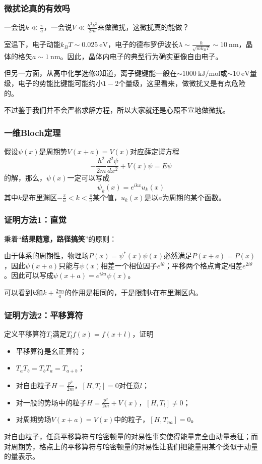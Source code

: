 \documentclass[CJK]{beamer}
\newcommand{\unit}[1]{\mathrm{\ #1}}
\begin{document}
\begin{frame}
\frametitle{\bch 微扰论真的有效吗 \ech}
\bch
一会说$k \ll \frac{\pi}{a}$，一会说$V \ll \frac{\hbar^2 k^2}{2m}$来做微扰，这微扰真的能做？
\par
室温下，电子动能$k_B T \sim 0.025 \unit{eV}$，电子的德布罗伊波长$\lambda \sim \frac{\hbar} { \sqrt{m k_B T}} \sim 10 \unit{nm}$，晶体的格矢$a\sim 1\unit{nm}$。因此，晶体内电子的典型行为确实更像自由电子。
\par
但另一方面，从高中化学选修3知道，离子键键能一般在$\sim 1000 \unit{kJ/mol}$或$\sim 10 \unit{eV}$量级，电子的势能比键能可能约小$1-2$个量级，这里看来，做微扰又是有点危险的。
\par
不过鉴于我们并不会严格求解方程，所以大家就还是心照不宣地做微扰。
\ech
\end{frame}

\begin{frame}
\frametitle{\bch 一维Bloch定理 \ech}
\bch
假设$\psi (x) $是周期势$V(x+a) = V(x)$对应薛定谔方程
$$
-\frac{\hbar^2}{2m} \frac{d^2 \psi}{dx^2} + V(x) \psi = E \psi
$$
的解，那么，$\psi (x)$一定可以写成
$$
\psi_k(x) = e^{ikx} u_k(x)
$$
其中$k$是布里渊区$-\frac{\pi}{a} < k < \frac{\pi}{a}$某个值，$u_k(x)$是以$a$为周期的某个函数。
\ech
\end{frame}


\begin{frame}
\frametitle{\bch 证明方法1：直觉 \ech}
\bch
秉着“{\bf 结果随意，路径搞笑}”的原则：\par
由于体系的周期性，物理场$P(x) = \psi^*(x) \psi(x)$必然满足$P(x+a) = P(x)$，因此$\psi(x+a)$只能与$\psi(x)$相差一个相位因子$e^{i\theta}$；平移两个格点肯定相差$e^{2i\theta}$。因此可以写成$\psi(x+a) = e^{ika} \psi(x)$。
\par
可以看到$k$和$k + \frac{2\pi n}{a}$的作用是相同的，于是限制$k$在布里渊区内。
\ech
\end{frame}


\begin{frame}
\frametitle{\bch 证明方法2：平移算符 \ech}
\bch
定义平移算符$T_l$满足$T_l f(x) = f(x+l)$，证明
\begin{itemize}
\item 平移算符是幺正算符；
\item $T_a T_b = T_b T_a = T_{a+b}$；
\item 对自由粒子$H = \frac{p^2}{2m}$，$[H,T_l]=0$对任意$l$；
\item 对一般的势场中的粒子$H = \frac{p^2}{2m} + V(x)$，$[H,T_l] \not= 0$；
\item 对周期势场$V(x+a) = V(x)$中的粒子，$[H,T_{na}] = 0$。
\end{itemize}
对自由粒子，任意平移算符与哈密顿量的对易性事实使得能量完全由动量表征；而对周期势，格点上的平移算符与哈密顿量的对易性让我们把能量用某个类似于动量的量表示。
\ech
\end{frame}
\end{document}
